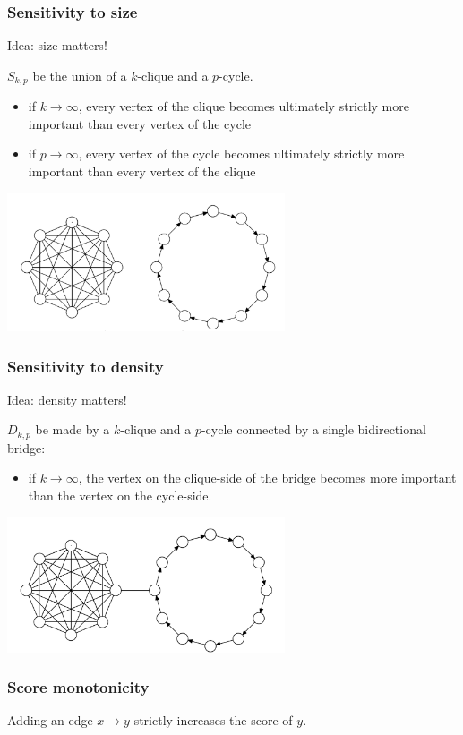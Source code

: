 \begin{frame}
  \frametitle{Sensitivity to size}
  Idea: size matters!

  $S_{k,p}$ be the union of a $k$-clique and a $p$-cycle.
  \begin{itemize}
    \item if $k\to\infty$, every vertex of the clique becomes ultimately
      strictly more important than every vertex of the cycle
    \item if $p\to\infty$, every vertex of the cycle becomes ultimately
      strictly more important than every vertex of the clique
  \end{itemize}
  \medskip
  \centering
  \includegraphics[width=82mm]{imgs/sts.pdf}
\end{frame}

\begin{frame}
  \frametitle{Sensitivity to density}
  Idea: density matters!

  $D_{k,p}$ be made by a $k$-clique and a $p$-cycle connected by a single
  bidirectional bridge:
  \begin{itemize}
    \item if $k\to\infty$, the vertex on the clique-side of the bridge
      becomes more important than the vertex on the cycle-side.
  \end{itemize}
  \medskip
  \centering
  \includegraphics[width=82mm]{imgs/std.pdf}
\end{frame}

\begin{frame}
  \frametitle{Score monotonicity}
  Adding an edge $x \to y$ strictly increases the score of $y$.

  \smallskip
\end{frame}

